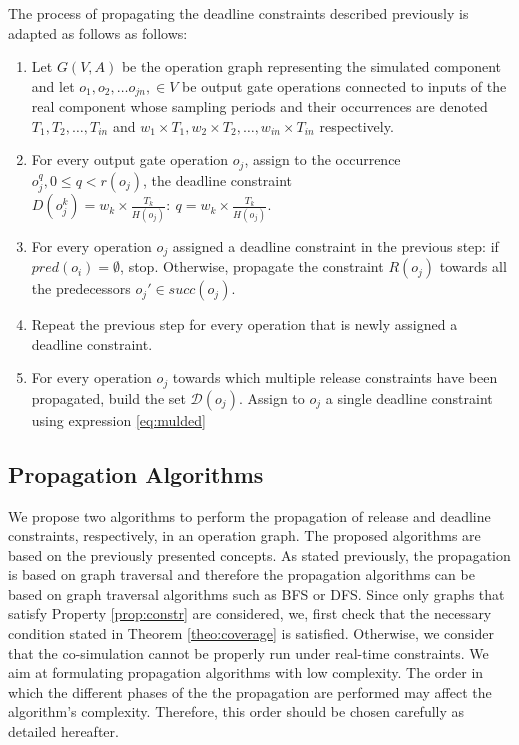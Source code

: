 The process of propagating the deadline constraints described previously is adapted as follows as follows:

\begin{enumerate}
\item Let $G(V,A)$ be the operation graph representing the simulated component and let $o_{1}, o_{2}, \ldots o_{jn},\in  V$ be output gate operations connected to inputs of the real component whose sampling periods and their occurrences are denoted $T_{1}, T_{2}, \ldots, T_{in}$ and $w_1 \times T_1, w_2 \times T_2, \ldots, w_{in} \times T_{in}$ respectively.
\item For every output gate operation $o_{j}$, assign to the occurrence $o_{j}^{q}, 0 \leq q < r(o_{j})$, the deadline constraint $D(o_{j}^{k}) = w_k \times \frac{T_{k}}{H(o_{j})}:\ q = w_k \times \frac{T_{k}}{H(o_{j})}$.
\item For every operation $o_j$ assigned a deadline constraint in the previous step: if $pred(o_i) = \emptyset$, stop. Otherwise, propagate the constraint $R(o_j)$ towards all the predecessors $o_j' \in succ(o_j)$.
\item Repeat the previous step for every operation that is newly assigned a deadline constraint.
\item For every operation $o_j$ towards which multiple release constraints have been propagated, build the set $\mathcal{D}(o_j)$. Assign to $o_j$ a single deadline constraint using expression \ref{eq:mulded}
\end{enumerate}

\subsection{Propagation Algorithms}

We propose two algorithms to perform the propagation of release and deadline constraints, respectively, in an operation graph. The proposed algorithms are based on the previously presented concepts. As stated previously, the propagation is based on graph traversal and therefore the propagation algorithms can be based on graph traversal algorithms such as BFS or DFS. Since only graphs that satisfy Property \ref{prop:constr} are considered, we, first check that the necessary condition stated in Theorem \ref{theo:coverage} is satisfied. Otherwise, we consider that the co-simulation cannot be properly run under real-time constraints. We aim at formulating propagation algorithms with low complexity. The order in which the different phases of the the propagation are performed may affect the algorithm's complexity. Therefore, this order should be chosen carefully as detailed hereafter.

